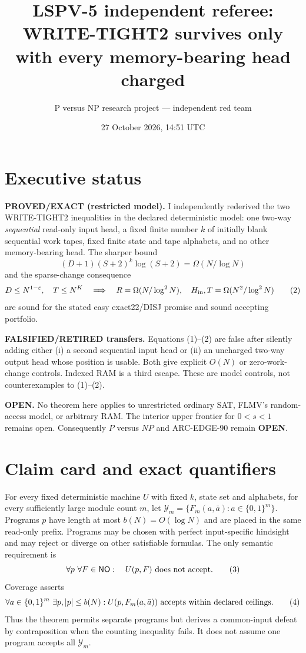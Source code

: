 \documentclass[11pt]{article}
\title{LSPV-5 independent referee: WRITE-TIGHT2 survives only with every memory-bearing head charged}
\author{P versus NP research project --- independent red team}
\date{27 October 2026, 14:51 UTC}
\newcommand{\NO}{\mathsf{NO}}
\begin{document}
\maketitle

\section*{Executive status}
\textbf{PROVED/EXACT (restricted model).}  I independently rederived the two
WRITE-TIGHT2 inequalities in the declared deterministic model: one two-way
\emph{sequential} read-only input head, a fixed finite number $k$ of initially
blank sequential work tapes, fixed finite state and tape alphabets, and no
other memory-bearing head.  The sharper bound
\[
 (D+1)(S+2)^k\log(S+2)=\Omega(N/\log N)
 \tag{1}
\]
and the sparse-change consequence
\[
 D\leq N^{1-\varepsilon},\quad T\leq N^K
 \quad\Longrightarrow\quad
 R=\Omega(N/\log^2N),\quad H_{\rm in},T=\Omega(N^2/\log^2N)
 \tag{2}
\]
are sound for the stated easy exact22/DISJ promise and sound accepting
portfolio.

\textbf{FALSIFIED/RETIRED transfers.}  Equations (1)--(2) are false after
silently adding either (i) a second sequential input head or (ii) an uncharged
two-way output head whose position is usable.  Both give explicit
$O(N)$ or zero-work-change controls.  Indexed RAM is a third escape.  These are
model controls, not counterexamples to (1)--(2).

\textbf{OPEN.}  No theorem here applies to unrestricted ordinary SAT, FLMV's
random-access model, or arbitrary RAM.  The interior upper frontier for
$0<s<1$ remains open.  Consequently $P$ versus $NP$ and ARC-EDGE-90 remain
\textbf{OPEN}.

\section{Claim card and exact quantifiers}
For every fixed deterministic machine $U$ with fixed $k$, state set and
alphabets, for every sufficiently large module count $m$, let
$\mathcal{Y}_m=\{F_m(a,\bar a):a\in\{0,1\}^m\}$.  Programs $p$ have length at
most $b(N)=O(\log N)$ and are placed in the same read-only prefix.  Programs
may be chosen with perfect input-specific hindsight and may reject or diverge
on other satisfiable formulas.  The only semantic requirement is
\[
 \forall p\ \forall F\in\NO:\quad U(p,F)\ \hbox{does not accept}.
 \tag{3}
\]
Coverage asserts
\[
 \forall a\in\{0,1\}^m\ \exists p, |p|\le b(N):
 U(p,F_m(a,\bar a))\ \hbox{accepts within declared ceilings}.
 \tag{4}
\]
Thus the theorem permits separate programs but derives a common-input defeat
by contraposition when the counting inequality fails.  It does not assume one
program accepts all $\mathcal{Y}_m$.
\end{document}
